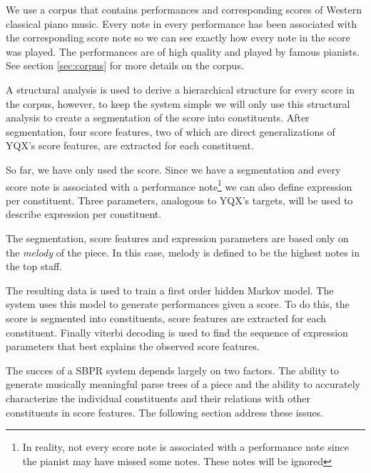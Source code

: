 \documentclass[a4paper,10pt]{article}
\begin{document}
We use a corpus that contains performances and corresponding scores of Western classical piano music. Every note in every performance has been associated with the corresponding score note so we can see exactly how every note in the score was played. The performances are of high quality and played by famous pianists. See section \ref{sec:corpus} for more details on the corpus.

A structural analysis is used to derive a hierarchical structure for every score in the corpus, however, to keep the system simple we will only use this structural analysis to create a segmentation of the score into constituents. After segmentation, four score features, two of which are direct generalizations of YQX's score features, are extracted for each constituent. 

So far, we have only used the score. Since we have a segmentation and every score note is associated with a performance note\footnote{In reality, not every score note is associated with a performance note since the pianist may have missed some notes. These notes will be ignored} we can also define expression per constituent. Three parameters, analogous to YQX's targets, will be used to describe expression per constituent.

The segmentation, score features and expression parameters are based only on the \textit{melody} of the piece. In this case, melody is defined to be the highest notes in the top staff.

The resulting data is used to train a first order hidden Markov model. The system uses this model to generate performances given a score. To do this, the score is segmented into constituents, score features are extracted for each constituent. Finally viterbi decoding is used to find the sequence of expression parameters that best explains the observed score features.

The succes of a SBPR system depends largely on two factors. The ability to generate musically meaningful parse trees of a piece and the ability to accurately characterize the individual constituents and their relations with other constituents in score features. The following section address these issues. 


\end{document}
